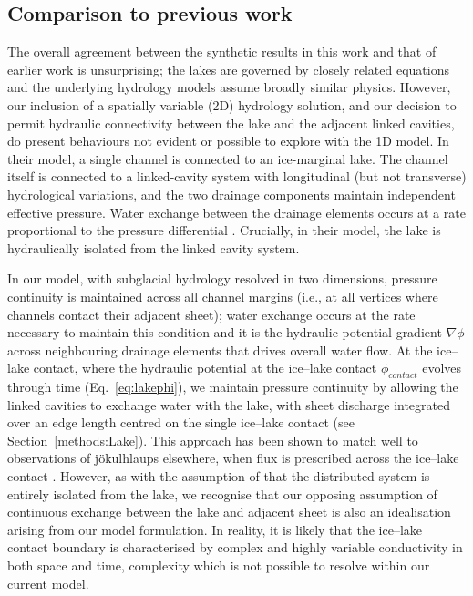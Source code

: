 \documentclass[tc, manuscript]{copernicus}
\begin{document}
\subsection{Comparison to previous work}
The overall agreement between the synthetic results in this work and that of earlier work \citep{kingslake2013modelling} is unsurprising; the lakes are governed by closely related equations and the underlying hydrology models assume broadly similar physics. However, our inclusion of a spatially variable (2D) hydrology solution, and our decision to permit hydraulic connectivity between the lake and the adjacent linked cavities, do present behaviours not evident or possible to explore with the 1D \citet{kingslake2013modelling} model. In their model, a single channel is connected to an ice-marginal lake. The channel itself is connected to a linked-cavity system with longitudinal (but not transverse) hydrological variations, and the two drainage components maintain independent effective pressure. Water exchange between the drainage elements occurs at a rate proportional to the pressure differential \citep[as in][]{hewitt2008seasonal}. Crucially, in their model, the lake is hydraulically isolated from the linked cavity system. 

In our model, with subglacial hydrology resolved in two dimensions, pressure continuity is maintained across all channel margins (i.e., at all vertices where channels contact their adjacent sheet); water exchange occurs at the rate necessary to maintain this condition and it is the hydraulic potential gradient $\nabla \phi$ across neighbouring drainage elements that drives overall water flow. At the ice--lake contact, where the hydraulic potential at the ice--lake contact $\phi_{contact}$ evolves through time (Eq.~\ref{eq:lakephi}), we maintain pressure continuity by allowing the linked cavities to exchange water with the lake, with sheet discharge integrated over an edge length centred on the single ice--lake contact (see Section~\ref{methods:Lake}). This approach has been shown to match well to observations of jökulhlaups elsewhere, when flux is prescribed across the ice--lake contact \citep[e.g.,][]{flowers2004coupled}. However, as with the assumption of \citet{kingslake2013modelling} that the distributed system is entirely isolated from the lake, we recognise that our opposing assumption of continuous exchange between the lake and adjacent sheet is also an idealisation arising from our model formulation. In reality, it is likely that the ice--lake contact boundary is characterised by complex and highly variable conductivity in both space and time, complexity which is not possible to resolve within our current model. 
\end{document}
